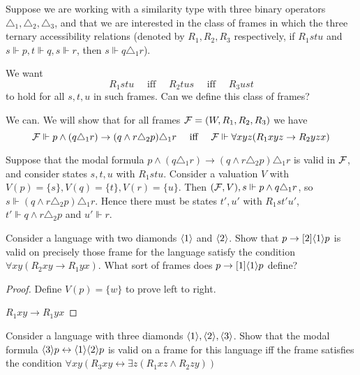 \documentclass[11pt]{article}
\begin{document}
\begin{examplle}[]
Suppose we are working with a similarity type with three binary operators
\(\triangle_1,\triangle_2, \triangle_3\), and that we are interested in the
class of frames in which the three ternary accessibility relations (denoted
by \(R_1,R_2,R_3\) respectively, if \(R_1stu\) and \(s\Vdash p,t\Vdash
   q,s\Vdash r\), then \(s\Vdash q\triangle_1 r\)).

We want
\begin{equation*}
 R_1stu \quad\text{ iff }\quad R_2tus \quad\text{ iff }\quad
 R_3ust
\end{equation*}
to hold for all \(s,t,u\) in such frames. Can we define this class of frames?

We can. We will show that for all frames \(\mathcal{F}=(W,R_1,R_2,R_3)\) we have
\begin{equation*}
 \mathcal{F}\Vdash p\wedge(q\triangle_1 r)\to(q\wedge r\triangle_2 p)
 \triangle_1 r
 \quad\text{ iff }\quad \mathcal{F}\Vdash\forall xyz(R_1xyz\to R_2yzx)
\end{equation*}

Suppose that the modal formula \(p\wedge(q\triangle_1 r)\to(q\wedge
   r\triangle_2 p)\triangle_1 r\) is valid in \(\mathcal{F}\), and consider states
\(s,t,u\) with \(R_1stu\). Consider a valuation \(V\) with
\(V(p)=\{s\},V(q)=\{t\},V(r)=\{u\}\). Then \((\mathcal{F},V),s\Vdash p\wedge
   q\triangle_1 r\), so \(s\Vdash(q\wedge r\triangle_2p)\triangle_1 r\). Hence
there must be states \(t',u'\) with \(R_1st'u'\), \(t'\Vdash q\wedge
   r\triangle_2p\) and \(u'\Vdash r\).
\end{examplle}

\begin{exercise}
\label{ex3.1,1}
Consider a language with two diamonds \(\langle1\rangle\) and \(\langle2\rangle\). Show that
\(p\to[2]\langle1\rangle p\)  is valid on precisely those frame for the language
satisfy the condition \(\forall xy(R_2xy\to R_1yx)\). What sort of frames does
\(p\to[1]\langle1\rangle p\) define?
\end{exercise}

\begin{proof}
Define \(V(p)=\{w\}\) to prove left to right.

\(R_1xy\to R_1yx\)
\end{proof}

\begin{exercise}
Consider a language with three diamonds \(\langle1\rangle,\langle2\rangle,\langle3\rangle\). Show
that the modal formula \(\langle3\rangle p\leftrightarrow\langle1\rangle\langle2\rangle p\) is valid
on a frame for this language iff the frame satisfies the condition \(\forall
   xy(R_3xy\leftrightarrow \exists z(R_1xz\wedge R_2zy))\)
\end{exercise}
\end{document}
